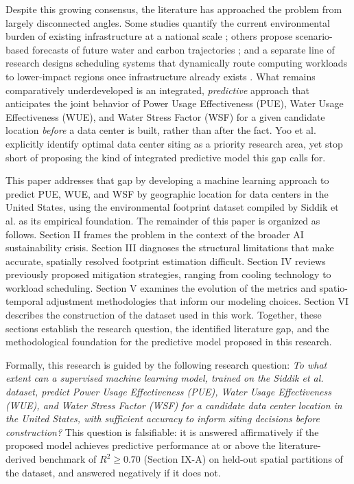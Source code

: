 \documentclass[conference]{IEEEtran}
\begin{document}
Despite this growing consensus, the literature has approached the problem from largely disconnected angles. Some studies quantify the current environmental burden of existing infrastructure at a national scale \cite{Guidi2024, Siddik2021}; others propose scenario-based forecasts of future water and carbon trajectories \cite{Herrera2025, Xiao2025NetZero}; and a separate line of research designs scheduling systems that dynamically route computing workloads to lower-impact regions once infrastructure already exists \cite{Hanafy2023, Jiang2025WaterWise}. What remains comparatively underdeveloped is an integrated, \textit{predictive} approach that anticipates the joint behavior of Power Usage Effectiveness (PUE), Water Usage Effectiveness (WUE), and Water Stress Factor (WSF) for a given candidate location \textit{before} a data center is built, rather than after the fact. Yoo et al. \cite{Yoo2026} explicitly identify optimal data center siting as a priority research area, yet stop short of proposing the kind of integrated predictive model this gap calls for.

This paper addresses that gap by developing a machine learning approach to predict PUE, WUE, and WSF by geographic location for data centers in the United States, using the environmental footprint dataset compiled by Siddik et al. \cite{Siddik2021} as its empirical foundation. The remainder of this paper is organized as follows. Section II frames the problem in the context of the broader AI sustainability crisis. Section III diagnoses the structural limitations that make accurate, spatially resolved footprint estimation difficult. Section IV reviews previously proposed mitigation strategies, ranging from cooling technology to workload scheduling. Section V examines the evolution of the metrics and spatio-temporal adjustment methodologies that inform our modeling choices. Section VI describes the construction of the dataset used in this work. Together, these sections establish the research question, the identified literature gap, and the methodological foundation for the predictive model proposed in this research.

Formally, this research is guided by the following research question: \textit{To what extent can a supervised machine learning model, trained on the Siddik et al. \cite{Siddik2021} dataset, predict Power Usage Effectiveness (PUE), Water Usage Effectiveness (WUE), and Water Stress Factor (WSF) for a candidate data center location in the United States, with sufficient accuracy to inform siting decisions before construction?} This question is falsifiable: it is answered affirmatively if the proposed model achieves predictive performance at or above the literature-derived benchmark of $R^2 \geq 0.70$ (Section IX-A) on held-out spatial partitions of the dataset, and answered negatively if it does not.
\end{document}

